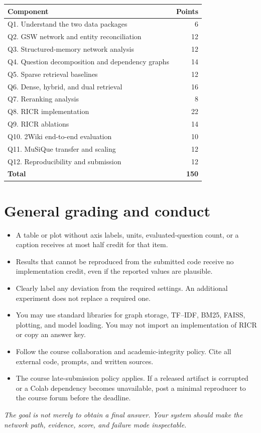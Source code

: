 \documentclass[11pt]{article}
\newcommand{\RICR}{{\mdseries\textsc{RICR}}\xspace}
\begin{document}
\begin{center}
\begin{tabularx}{0.96\textwidth}{@{}Y r@{}}
\toprule
\textbf{Component} & \textbf{Points}\\
\midrule
Q1. Understand the two data packages & 6\\
Q2. GSW network and entity reconciliation & 12\\
Q3. Structured-memory network analysis & 12\\
Q4. Question decomposition and dependency graphs & 14\\
Q5. Sparse retrieval baselines & 12\\
Q6. Dense, hybrid, and dual retrieval & 16\\
Q7. Reranking analysis & 8\\
Q8. \RICR implementation & 22\\
Q9. \RICR ablations & 14\\
Q10. 2Wiki end-to-end evaluation & 10\\
Q11. MuSiQue transfer and scaling & 12\\
Q12. Reproducibility and submission & 12\\
\midrule
\textbf{Total} & \textbf{150}\\
\bottomrule
\end{tabularx}
\end{center}

\section{General grading and conduct}

\begin{itemize}
  \item A table or plot without axis labels, units, evaluated-question count,
        or a caption receives at most half credit for that item.
  \item Results that cannot be reproduced from the submitted code receive no
        implementation credit, even if the reported values are plausible.
  \item Clearly label any deviation from the required settings. An additional
        experiment does not replace a required one.
  \item You may use standard libraries for graph storage, TF--IDF, BM25, FAISS,
        plotting, and model loading. You may not import an implementation of
        \RICR or copy an answer key.
  \item Follow the course collaboration and academic-integrity policy. Cite
        all external code, prompts, and written sources.
  \item The course late-submission policy applies. If a released artifact is
        corrupted or a Colab dependency becomes unavailable, post a minimal
        reproducer to the course forum before the deadline.
\end{itemize}

\vfill
\begin{center}
\textit{The goal is not merely to obtain a final answer. Your system should
make the network path, evidence, score, and failure mode inspectable.}
\end{center}
\end{document}
